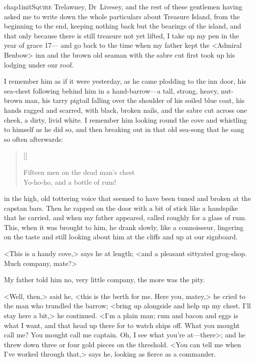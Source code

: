 

\lettrine{chap1initS}{quire} Trelawney, Dr~Livesey, and the rest of these gentlemen having asked me to write down the whole particulars about Treasure Island, from the beginning to the end, keeping nothing back but the bearings of the island, and that only because there is still treasure not yet lifted, I take up my pen in the year of grace 17— and go back to the time when my father kept the <Admiral Benbow> inn and the brown old seaman with the sabre cut first took up his lodging under our roof.

I remember him as if it were yesterday, as he came plodding to the inn door, his sea-chest following behind him in a hand-barrow—a tall, strong, heavy, nut-brown man, his tarry pigtail falling over the shoulder of his soiled blue coat, his hands ragged and scarred, with black, broken nails, and the sabre cut across one cheek, a dirty, livid white. I remember him looking round the cove and whistling to himself as he did so, and then breaking out in that old sea-song that he sang so often afterwards:

\settowidth{\versewidth}{Fifteen men on the dead man’s chest—}
\begin{verse}[\versewidth]
\begin{altverse}
Fifteen men on the dead man’s chest\longdash\\
Yo-ho-ho, and a bottle of rum!
\end{altverse}
\end{verse}

\vspace{-0.5em}

in the high, old tottering voice that seemed to have been tuned and broken at the capstan bars. Then he rapped on the door with a bit of stick like a handspike that he carried, and when my father appeared, called roughly for a glass of rum. This, when it was brought to him, he drank slowly, like a connoisseur, lingering on the taste and still looking about him at the cliffs and up at our signboard.

<This is a handy cove,> says he at length; <and a pleasant sittyated grog-shop. Much company, mate?>

My father told him no, very little company, the more was the pity.

<Well, then,> said he, <this is the berth for me. Here you, matey,> he cried to the man who trundled the barrow; <bring up alongside and help up my chest. I'll stay here a bit,> he continued. <I'm a plain man; rum and bacon and eggs is what I want, and that head up there for to watch ships off. What you mought call me? You mought call me captain. Oh, I see what you're at—there>; and he threw down three or four gold pieces on the threshold. <You can tell me when I've worked through that,> says he, looking as fierce as a commander.

